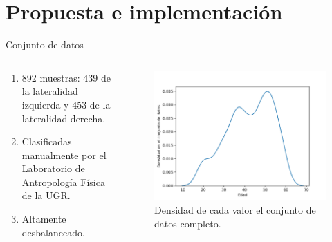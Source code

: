 \documentclass{beamer}
\begin{document}
\section{Propuesta e implementación}
\begin{frame}{Conjunto de datos}

	\begin{columns}[T]
		\begin{column}{.5\textwidth}
			\vspace*{1cm}
			\begin{enumerate}
				\item 892 muestras: 439 de la lateralidad izquierda y 453 de la lateralidad derecha.
				\item Clasificadas manualmente por el Laboratorio de Antropología Física de la UGR.
				\item Altamente desbalanceado.
			\end{enumerate}
		\end{column}

		\begin{column}{.5\textwidth}
			\begin{figure}[H]
				\centering
				\includegraphics[width=1.15\textwidth]{completo_regresion.csv.png}
				\caption{Densidad de cada valor el conjunto de datos completo.}
				\label{fig:conjunto_regresion}
			\end{figure}
		\end{column}

	\end{columns}

\end{frame}
\end{document}
